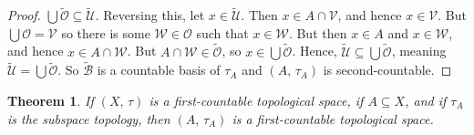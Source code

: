 \documentclass{article}
\theoremstyle{plain}
\newtheorem{theorem}{Theorem}[section]
\theoremstyle{normal}
\begin{document}
\begin{proof}
            $\bigcup\tilde{\mathcal{O}}\subseteq\tilde{\mathcal{U}}$. Reversing
            this, let $x\in\tilde{\mathcal{U}}$. Then $x\in{A}\cap\mathcal{V}$,
            and hence $x\in\mathcal{V}$. But $\bigcup\mathcal{O}=\mathcal{V}$
            so there is some $\mathcal{W}\in\mathcal{O}$ such that
            $x\in\mathcal{W}$. But then $x\in{A}$ and $x\in\mathcal{W}$, and
            hence $x\in{A}\cap\mathcal{W}$. But
            $A\cap\mathcal{W}\in\tilde{\mathcal{O}}$, so
            $x\in\bigcup\tilde{\mathcal{O}}$. Hence,
            $\tilde{\mathcal{U}}\subseteq\bigcup\tilde{\mathcal{O}}$, meaning
            $\tilde{\mathcal{U}}=\bigcup\tilde{\mathcal{O}}$. So
            $\tilde{\mathcal{B}}$ is a countable basis of $\tau_{A}$ and
            $(A,\,\tau_{A})$ is second-countable.
        \end{proof}
        \begin{theorem}
            If $(X,\,\tau)$ is a first-countable topological space, if
            $A\subseteq{X}$, and if $\tau_{A}$ is the subspace topology, then
            $(A,\,\tau_{A})$ is a first-countable topological space.
        \end{theorem}
\end{document}
